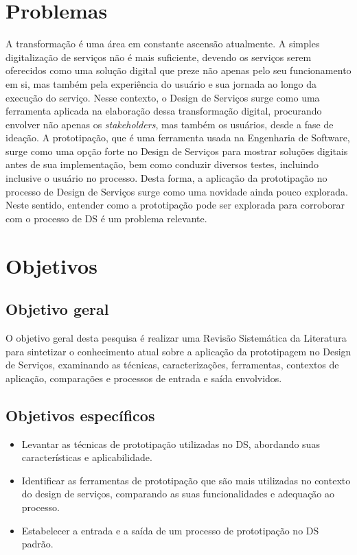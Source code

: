 \section {Problemas}

A transformação é uma área em constante ascensão atualmente. A simples digitalização de serviços não é mais suficiente, devendo os serviços serem oferecidos como uma solução digital que preze não apenas pelo seu funcionamento em si, mas também pela experiência do usuário e sua jornada ao longo da execução do serviço. Nesse contexto, o Design de Serviços surge como uma ferramenta aplicada na elaboração dessa transformação digital, procurando envolver não apenas os \textit{stakeholders}, mas também os usuários, desde a fase de ideação. A prototipação, que é uma ferramenta usada na Engenharia de Software, surge como uma opção forte no Design de Serviços para mostrar soluções digitais antes de sua implementação, bem como conduzir diversos testes, incluindo inclusive o usuário no processo. Desta forma, a aplicação da prototipação no processo de Design de Serviços surge como uma novidade ainda pouco explorada. Neste sentido, entender como a prototipação pode ser explorada para corroborar com o processo de DS é um problema relevante.

\section {Objetivos}
\subsection{Objetivo geral}

O objetivo geral desta pesquisa é realizar uma Revisão Sistemática da Literatura para sintetizar o conhecimento atual sobre a aplicação da prototipagem no Design de Serviços, examinando as técnicas, caracterizações, ferramentas, contextos de aplicação, comparações e processos de entrada e saída envolvidos. %

\subsection{Objetivos específicos}

\begin{itemize}
	\item Levantar as técnicas de prototipação utilizadas no DS, abordando suas características e aplicabilidade.
	
	\item Identificar as ferramentas de prototipação que são mais utilizadas no contexto do design de serviços, comparando as suas funcionalidades e adequação ao processo.
	
	\item Estabelecer a entrada e a saída de um processo de prototipação no DS padrão.%
\end{itemize}

